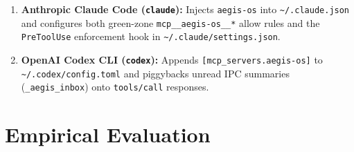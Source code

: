 \documentclass[acmsmall,screen,review]{acmart}
\begin{document}
\begin{enumerate}
\begin{itemize}
    \end{itemize}
    \item \textbf{Anthropic Claude Code (\texttt{claude}):} Injects \texttt{aegis-os} into \texttt{\textasciitilde/.claude.json} and configures both green-zone \texttt{mcp\_\_\allowbreak aegis-os\_\_*} allow rules and the \texttt{PreToolUse} enforcement hook in \texttt{\textasciitilde/.claude/\allowbreak settings.json}.
    \item \textbf{OpenAI Codex CLI (\texttt{codex}):} Appends \texttt{[mcp\_servers.\allowbreak aegis-os]} to \texttt{\textasciitilde/.codex/\allowbreak config.toml} and piggybacks unread IPC summaries (\texttt{\_aegis\_inbox}) onto \texttt{tools/call} responses.
\end{enumerate}

\section{Empirical Evaluation}
\label{sec:eval}
\end{document}
